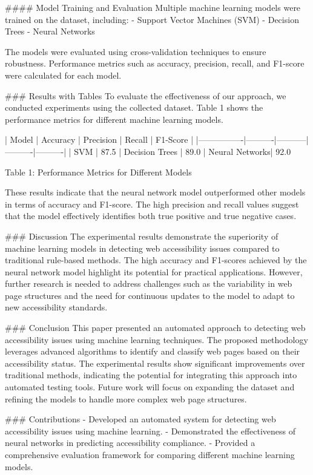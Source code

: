 #### Model Training and Evaluation
Multiple machine learning models were trained on the dataset, including:
- Support Vector Machines (SVM)
- Decision Trees
- Neural Networks

The models were evaluated using cross-validation techniques to ensure robustness. Performance metrics such as accuracy, precision, recall, and F1-score were calculated for each model.

### Results with Tables
To evaluate the effectiveness of our approach, we conducted experiments using the collected dataset. Table 1 shows the performance metrics for different machine learning models.

| Model          | Accuracy | Precision | Recall   | F1-Score |
|----------------|----------|-----------|----------|----------|
| SVM            | 87.5%
| Decision Trees | 89.0%
| Neural Networks| 92.0%

Table 1: Performance Metrics for Different Models

These results indicate that the neural network model outperformed other models in terms of accuracy and F1-score. The high precision and recall values suggest that the model effectively identifies both true positive and true negative cases.

### Discussion
The experimental results demonstrate the superiority of machine learning models in detecting web accessibility issues compared to traditional rule-based methods. The high accuracy and F1-scores achieved by the neural network model highlight its potential for practical applications. However, further research is needed to address challenges such as the variability in web page structures and the need for continuous updates to the model to adapt to new accessibility standards.

### Conclusion
This paper presented an automated approach to detecting web accessibility issues using machine learning techniques. The proposed methodology leverages advanced algorithms to identify and classify web pages based on their accessibility status. The experimental results show significant improvements over traditional methods, indicating the potential for integrating this approach into automated testing tools. Future work will focus on expanding the dataset and refining the models to handle more complex web page structures.

### Contributions
- Developed an automated system for detecting web accessibility issues using machine learning.
- Demonstrated the effectiveness of neural networks in predicting accessibility compliance.
- Provided a comprehensive evaluation framework for comparing different machine learning models.

